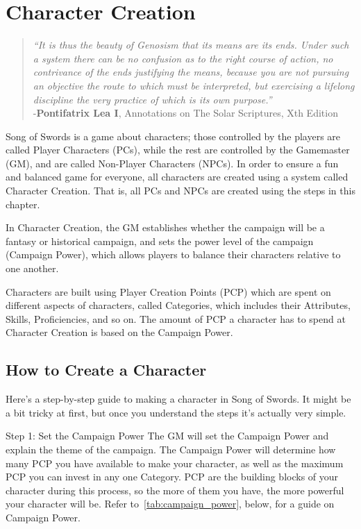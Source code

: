 \documentclass[oneside,11pt,english]{book}
\begin{document}
\chapter{Character Creation}\label{ch:charcreation}
\startcontents[chapters]
\newpage
	\begin{quote}
		\emph{“It is thus the beauty of Genosism that its means are its ends. Under such a system there can be no confusion as to the right course of action, no contrivance of the ends justifying the means, because you are not pursuing an objective the route to which must be interpreted, but exercising a lifelong discipline the very practice of which is its own purpose.”}\\ 

		\hfill -\textbf{Pontifatrix Lea I}, Annotations on The Solar Scriptures, Xth Edition 
	\end{quote} 
Song of Swords is a game about characters; those controlled by the players are called Player Characters 
(PCs), while the rest are controlled by the Gamemaster (GM), and are called Non-Player Characters 
(NPCs). In order to ensure a fun and balanced game for everyone, all characters are created using a 
system called Character Creation. That is, all PCs and NPCs are created using the steps in this chapter. 

 
In Character Creation, the GM establishes whether the campaign will be a fantasy or historical campaign, 
and sets the power level of the campaign (Campaign Power), which allows players to balance their 
characters relative to one another. 

 
Characters are built using Player Creation Points (PCP) which are spent on different aspects of characters, 
called Categories, which includes their Attributes, Skills, Proficiencies, and so on. The amount of PCP a 
character has to spend at Character Creation is based on the Campaign Power. 

 
\section{How to Create a Character}
Here’s a step-by-step guide to making a character in Song of Swords. It might be a bit tricky at first, but 
once you understand the steps it’s actually very simple. 

Step 1: Set the Campaign Power 
The GM will set the Campaign Power and explain the theme of the campaign. The Campaign Power will 
determine how many PCP you have available to make your character, as well as the maximum PCP you 
can invest in any one Category. PCP are the building blocks of your character during this process, so the 
more of them you have, the more powerful your character will be. Refer to~\autoref{tab:campaign_power}, below, for a guide 
on Campaign Power. 
 
\end{document}
